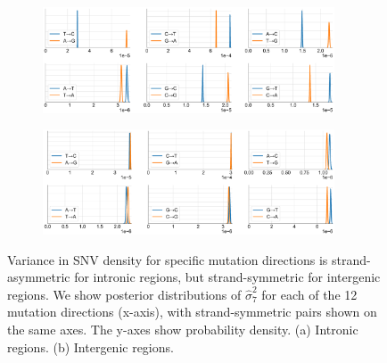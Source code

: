 \begin{figure}[]
\begin{subfigure} {1.0\textwidth}
\begin{center}
\includegraphics[width=0.95\textwidth, keepaspectratio]{figs/fig_ss_all_a.eps}
\caption 
{\label{fig:context-sym-intronic-a}}
\end{center}
\end{subfigure}
\begin{subfigure}{1.0\textwidth}
\begin{center}
\includegraphics[width=0.95\textwidth, keepaspectratio]{figs/fig_ss_all_b.eps}
\caption 
{\label{fig:context-sym-intronic-b}}
\end{center}
\end{subfigure}
\caption{Variance in SNV density for specific mutation directions is strand-asymmetric for intronic regions, but strand-symmetric for intergenic regions. We show posterior distributions of $\hat{\sigma}_7^2$ for each of the 12 mutation directions (x-axis), with strand-symmetric pairs shown on the same axes. The y-axes show probability density. (a) Intronic regions. (b) Intergenic regions.}
\end{figure}